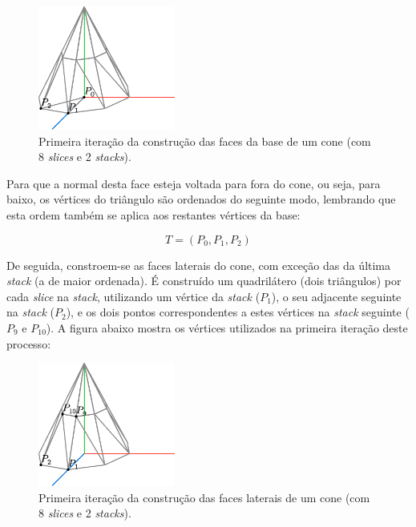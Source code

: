 \documentclass[12pt, a4paper]{article}
\begin{document}
\begin{figure}[H]
    \centering
    \includegraphics[width=0.4\textwidth]{res/figures/Cone3.pdf}
    \caption{
        \onehalfspacing
        Primeira iteração da construção das faces da base de um cone (com 8 \emph{slices} e 2
        \emph{stacks}).
    }
\end{figure}

Para que a normal desta face esteja voltada para fora do cone, ou seja, para baixo, os vértices do
triângulo são ordenados do seguinte modo, lembrando que esta ordem também se aplica aos restantes
vértices da base:

$$
T = (P_0, P_1, P_2)
$$

De seguida, constroem-se as faces laterais do cone, com exceção das da última \emph{stack} (a de
maior ordenada). É construído um quadrilátero (dois triângulos) por cada \emph{slice} na
\emph{stack}, utilizando um vértice da \emph{stack} ($P_1$), o seu adjacente seguinte na
\emph{stack} ($P_2$), e os dois pontos correspondentes a estes vértices na \emph{stack} seguinte
($P_9$ e $P_{10}$). A figura abaixo mostra os vértices utilizados na primeira iteração deste
processo:

\begin{figure}[H]
    \centering
    \includegraphics[width=0.4\textwidth]{res/figures/Cone4.pdf}
    \caption{
        \onehalfspacing
        Primeira iteração da construção das faces laterais de um cone (com 8 \emph{slices} e 2
        \emph{stacks}).
    }
\end{figure}
\end{document}
